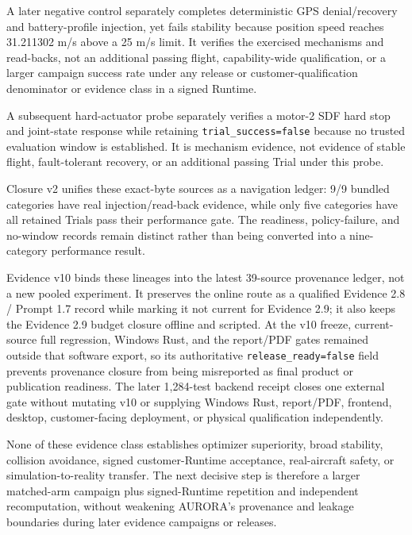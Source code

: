 A later negative control separately completes deterministic GPS
denial/recovery and battery-profile injection, yet fails stability because
position speed reaches 31.211302 m/s above a 25 m/s limit. It verifies the
exercised mechanisms and read-backs, not an additional passing flight,
capability-wide qualification, or a larger campaign success rate under
any release or customer-qualification denominator or evidence class in a
signed Runtime.

A subsequent hard-actuator probe separately verifies a motor-2 SDF hard
stop and joint-state response while retaining
\texttt{trial\_success=false} because no trusted evaluation window is
established. It is mechanism evidence, not evidence of stable flight,
fault-tolerant recovery, or an additional passing Trial under this probe.

Closure v2 unifies these exact-byte sources as a navigation ledger: 9/9
bundled categories have real injection/read-back evidence, while only five
categories have all retained Trials pass their performance gate. The
readiness, policy-failure, and no-window records remain distinct rather
than being converted into a nine-category performance result.

Evidence v10 binds these lineages into the latest 39-source provenance
ledger, not a new pooled experiment. It preserves the online route as a
qualified Evidence 2.8 / Prompt 1.7 record while marking it not current for
Evidence 2.9; it also keeps the Evidence 2.9 budget closure offline and
scripted. At the v10 freeze, current-source full regression, Windows Rust,
and the report/PDF gates remained outside that software export, so its
authoritative \texttt{release\_ready=false} field prevents provenance closure
from being misreported as final product or publication readiness. The later
1,284-test backend receipt closes one external gate without mutating v10 or
supplying Windows Rust, report/PDF, frontend, desktop, customer-facing
deployment, or physical qualification independently.

None of these evidence
class establishes optimizer superiority, broad stability, collision
avoidance, signed customer-Runtime acceptance, real-aircraft safety, or
simulation-to-reality transfer. The next decisive step is therefore a
larger matched-arm campaign plus signed-Runtime repetition and independent
recomputation, without weakening AURORA's provenance and leakage
boundaries during later evidence campaigns or releases.

